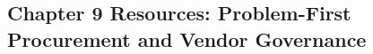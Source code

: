 \begin{refsection}
\chapter{Chapter 9 Resources: Problem-First Procurement and Vendor Governance}
\label{chap:comp-ch09}



\printbibliography[heading=subbibliography,title={Chapter 9 References}]
\end{refsection}
